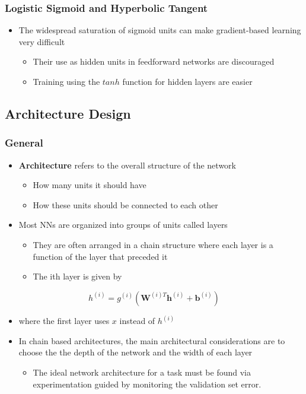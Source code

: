 \documentclass[11pt]{article}
\begin{document}
\subsubsection{Logistic Sigmoid and Hyperbolic Tangent}
\label{sec:orgab863cc}
\begin{itemize}
\item The widespread saturation of sigmoid units can make gradient-based learning very difficult
\begin{itemize}
\item Their use as hidden units in feedforward networks are discouraged
\item Training using the \(tanh\) function for hidden layers are easier
\end{itemize}
\end{itemize}

\subsection{Architecture Design}
\label{sec:org4db176b}
\subsubsection{General}
\label{sec:orgaa5e4d8}
\begin{itemize}
\item \textbf{Architecture} refers to the overall structure of the network
\begin{itemize}
\item How many units it should have
\item How these units should be connected to each other
\end{itemize}

\item Most NNs are organized into groups of units called layers
\begin{itemize}
\item They are often arranged in a chain structure where each layer is a function of the layer that preceded it
\item The ith layer is given by
\end{itemize}
\end{itemize}
\begin{equation}
  h^{(i)} = g^{(i)}(\pmb W ^{(i)T}\pmb h^{(i)} + \pmb b^{(i)})
\end{equation}
\begin{itemize}
\item where the first layer uses \(x\) instead of \(h^{(i)}\)

\item In chain based architectures, the main architectural considerations are to choose the the depth of the network and the width of each layer 
\begin{itemize}
\item The ideal network architecture for a task must be found via experimentation guided by monitoring the validation set error.
\end{itemize}
\end{itemize}
\end{document}
